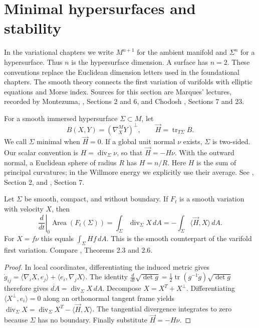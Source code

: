 \chapter{Minimal hypersurfaces and stability}\label{sec:minimal-stability}
In the variational chapters we write $M^{n+1}$ for the ambient manifold and $\Sigma^n$ for a hypersurface. Thus $n$ is the hypersurface dimension. A surface has $n=2$. These conventions replace the Euclidean dimension letters used in the foundational chapters. The smooth theory connects the first variation of varifolds with elliptic equations and Morse index. Sources for this section are Marques' lectures, recorded by Montezuma, \cite{MM}, Sections 2 and 6, and Chodosh \cite{ChMin}, Sections 7 and 23.

\begin{definition}\label{def:smooth-minimal}
For a smooth immersed hypersurface $\Sigma\subset M$, let
\[
 B(X,Y)=(\nabla^M_XY)^\perp,\qquad
 \vec H=\operatorname{tr}_{T\Sigma}B.
\]
We call $\Sigma$ minimal when $\vec H=0$. If a global unit normal $\nu$ exists, $\Sigma$ is two-sided. Our scalar convention is $H=\operatorname{div}_{\Sigma}\nu$, so that $\vec H=-H\nu$. With the outward normal, a Euclidean sphere of radius $R$ has $H=n/R$. Here $H$ is the sum of principal curvatures; in the Willmore energy we explicitly use their average. See \cite{MM}, Section 2, and \cite{ChMin}, Section 7.
\end{definition}

\begin{proposition}\label{prop:smooth-first-variation}
Let $\Sigma$ be smooth, compact, and without boundary. If $F_t$ is a smooth variation with velocity $X$, then
\[
 \left.\frac{d}{dt}\right|_{0}\operatorname{Area}(F_t(\Sigma))
 =\int_\Sigma\operatorname{div}_\Sigma X\,dA
 =-\int_\Sigma\langle\vec H,X\rangle\,dA.
\]
For $X=f\nu$ this equals $\int_\Sigma Hf\,dA$. This is the smooth counterpart of the varifold first variation. Compare \cite{MM}, Theorems 2.3 and 2.6.
\end{proposition}
\begin{proof}
In local coordinates, differentiating the induced metric gives
$\dot g_{ij}=\langle\nabla_iX,e_j\rangle+\langle e_i,\nabla_jX\rangle$.
The identity $\frac{d}{dt}\sqrt{\det g}=\frac12\operatorname{tr}(g^{-1}\dot g)\sqrt{\det g}$ therefore gives $\dot{dA}=\operatorname{div}_\Sigma X\,dA$.
Decompose $X=X^T+X^\perp$. Differentiating $\langle X^\perp,e_i\rangle=0$ along an orthonormal tangent frame yields
$\operatorname{div}_\Sigma X=\operatorname{div}_\Sigma X^T-\langle\vec H,X\rangle$.
The tangential divergence integrates to zero because $\Sigma$ has no boundary. Finally substitute $\vec H=-H\nu$.
\end{proof}

